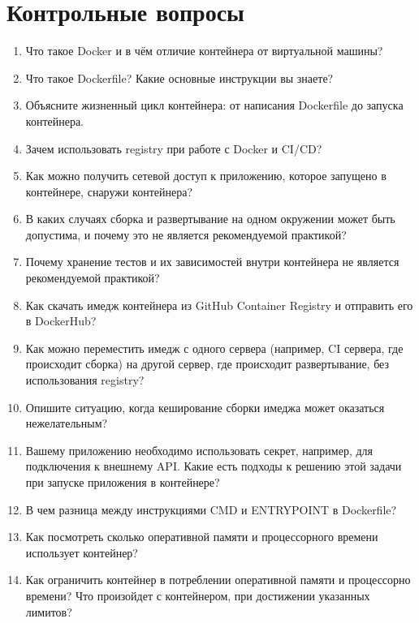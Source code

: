 \documentclass[12pt,a4paper]{article}
\begin{document}
\section{Контрольные вопросы}
\begin{enumerate}
    \item Что такое Docker и в чём отличие контейнера от виртуальной машины?
    \item Что такое Dockerfile? Какие основные инструкции вы знаете?
    \item Объясните жизненный цикл контейнера: от написания Dockerfile до запуска контейнера.
    \item Зачем использовать registry при работе с Docker и CI/CD?
    \item Как можно получить сетевой доступ к приложению, которое запущено в контейнере, снаружи контейнера?
    \item В каких случаях сборка и развертывание на одном окружении может быть допустима, и почему это не является рекомендуемой практикой?
    \item Почему хранение тестов и их зависимостей внутри контейнера не является рекомендуемой практикой?
    \item Как скачать имедж контейнера из GitHub Container Registry и отправить его в DockerHub?
    \item Как можно переместить имедж с одного сервера (например, CI сервера, где происходит сборка) на другой сервер, где происходит развертывание, без использования registry?
    \item Опишите ситуацию, когда кеширование сборки имеджа может оказаться нежелательным?
    \item Вашему приложению необходимо использовать секрет, например, для подключения к внешнему API. Какие есть подходы к решению этой задачи при запуске приложения в контейнере?
    \item В чем разница между инструкциями CMD и ENTRYPOINT в Dockerfile?
    \item Как посмотреть сколько оперативной памяти и процессорного времени использует контейнер?
    \item Как ограничить контейнер в потреблении оперативной памяти и процессорно времени? Что произойдет с контейнером, при достижении указанных лимитов?
\end{enumerate}
\end{document}
